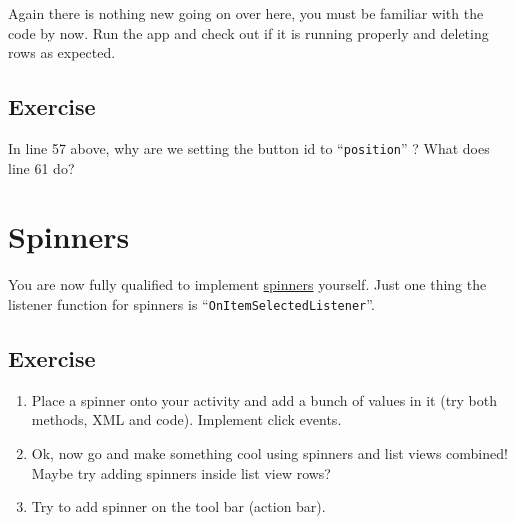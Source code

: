 Again there is nothing new going on over here, you must be familiar with the code by now. Run the app and check out if it is running properly and deleting rows as expected.

\subsection{Exercise}
In line 57 above, why are we setting the button id to ``\texttt{position}'' ? What does line 61 do?

\section{Spinners}
You are now fully qualified to implement \href{https://developer.android.com/guide/topics/ui/controls/spinner.html}{spinners} yourself. Just one thing the listener function for spinners is ``\texttt{OnItemSelectedListener}''.

\subsection{Exercise}
\begin{enumerate}
	\item Place a spinner onto your activity and add a bunch of values in it (try both methods, XML and code). Implement click events.
	\item Ok, now go and make something cool using spinners and list views combined! Maybe try adding spinners inside list view rows?
	\item Try to add spinner on the tool bar (action bar).
\end{enumerate}
